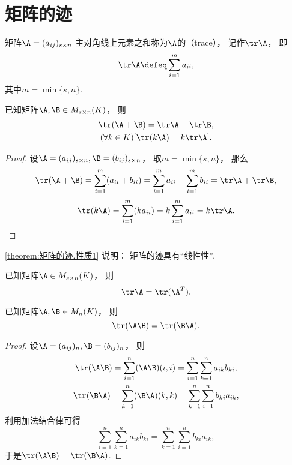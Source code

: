 \section{矩阵的迹}
\begin{definition}
矩阵\(\A=(a_{ij})_{s \times n}\)
主对角线上元素之和称为\(\A\)的（trace），
记作\(\tr\A\)，
即\[
	\tr\A
	\defeq
	\sum_{i=1}^m a_{ii},
\]
其中\(m = \min\{s,n\}\).
\end{definition}

\begin{property}\label{theorem:矩阵的迹.性质1}
已知矩阵\(\A,\B \in M_{s \times n}(K)\)，
则\begin{gather}
	\tr(\A+\B) = \tr\A + \tr\B, \\
	(\forall k \in K)[\tr(k \A) = k \tr\A].
\end{gather}
\begin{proof}
设\(\A=(a_{ij})_{s \times n},
\B=(b_{ij})_{s \times n}\)，
取\(m = \min\{s,n\}\)，
那么\[
	\tr(\A+\B) = \sum_{i=1}^m (a_{ii}+b_{ii})
	= \sum_{i=1}^m a_{ii}
	+ \sum_{i=1}^m b_{ii}
	= \tr\A + \tr\B,
\]\[
	\tr(k \A) = \sum_{i=1}^m (k a_{ii})
	= k \sum_{i=1}^m a_{ii}
	= k \tr\A.
	\qedhere
\]
\end{proof}
\end{property}
\cref{theorem:矩阵的迹.性质1} 说明：
矩阵的迹具有“线性性”.

\begin{property}\label{theorem:矩阵的迹.性质2}
已知矩阵\(\A \in M_{s \times n}(K)\)，
则\begin{equation}
	\tr\A = \tr(\A^T).
\end{equation}
\end{property}

\begin{property}\label{theorem:矩阵的迹.矩阵乘积交换次序不变迹}
已知矩阵\(\A,\B \in M_n(K)\)，
则\begin{equation}
	\tr(\A\B) = \tr(\B\A).
\end{equation}
\begin{proof}
设\(\A = (a_{ij})_n,
\B = (b_{ij})_n\)，
则\begin{gather*}
	\tr(\A\B)
	= \sum_{i=1}^n (\A\B)(i,i)
	= \sum_{i=1}^n \sum_{k=1}^n a_{ik} b_{ki}, \\
	\tr(\B\A)
	= \sum_{k=1}^n (\B\A)(k,k)
	= \sum_{k=1}^n \sum_{i=1}^n b_{ki} a_{ik},
\end{gather*}
利用加法结合律可得\[
	\sum_{i=1}^n \sum_{k=1}^n a_{ik} b_{ki}
	= \sum_{k=1}^n \sum_{i=1}^n b_{ki} a_{ik},
\]
于是\(\tr(\A\B) = \tr(\B\A)\).
\end{proof}
\end{property}

